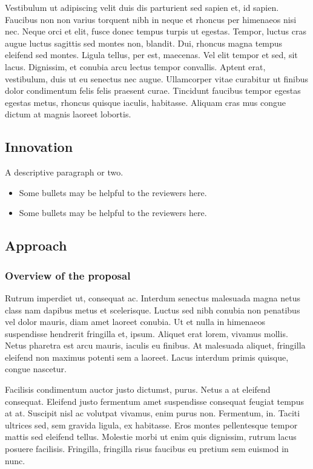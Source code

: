 \documentclass[11pt,]{article}
\providecommand{\tightlist}{%
  \setlength{\itemsep}{0pt}\setlength{\parskip}{0pt}}
\begin{document}
Vestibulum ut adipiscing velit duis dis parturient sed sapien et, id
sapien. Faucibus non non varius torquent nibh in neque et rhoncus per
himenaeos nisi nec. Neque orci et elit, fusce donec tempus turpis ut
egestas. Tempor, luctus cras augue luctus sagittis sed montes non,
blandit. Dui, rhoncus magna tempus eleifend sed montes. Ligula tellus,
per est, maecenas. Vel elit tempor et sed, sit lacus. Dignissim, et
conubia arcu lectus tempor convallis. Aptent erat, vestibulum, duis ut
eu senectus nec augue. Ullamcorper vitae curabitur ut finibus dolor
condimentum felis felis praesent curae. Tincidunt faucibus tempor
egestas egestas metus, rhoncus quisque iaculis, habitasse. Aliquam cras
mus congue dictum at magnis laoreet lobortis.

\hypertarget{innovation}{%
\subsection{Innovation}\label{innovation}}

A descriptive paragraph or two.

\begin{itemize}
\tightlist
\item
  Some bullets may be helpful to the reviewers here.
\item
  Some bullets may be helpful to the reviewers here.
\end{itemize}

\hypertarget{approach}{%
\subsection{Approach}\label{approach}}

\hypertarget{overview-of-the-proposal}{%
\subsubsection{Overview of the
proposal}\label{overview-of-the-proposal}}

Rutrum imperdiet ut, consequat ac. Interdum senectus malesuada magna
netus class nam dapibus metus et scelerisque. Luctus sed nibh conubia
non penatibus vel dolor mauris, diam amet laoreet conubia. Ut et nulla
in himenaeos suspendisse hendrerit fringilla et, ipsum. Aliquet erat
lorem, vivamus mollis. Netus pharetra est arcu mauris, iaculis eu
finibus. At malesuada aliquet, fringilla eleifend non maximus potenti
sem a laoreet. Lacus interdum primis quisque, congue nascetur.

Facilisis condimentum auctor justo dictumst, purus. Netus a at eleifend
consequat. Eleifend justo fermentum amet suspendisse consequat feugiat
tempus at at. Suscipit nisl ac volutpat vivamus, enim purus non.
Fermentum, in. Taciti ultrices sed, sem gravida ligula, ex habitasse.
Eros montes pellentesque tempor mattis sed eleifend tellus. Molestie
morbi ut enim quis dignissim, rutrum lacus posuere facilisis. Fringilla,
fringilla risus faucibus eu pretium sem euismod in nunc.
\end{document}
